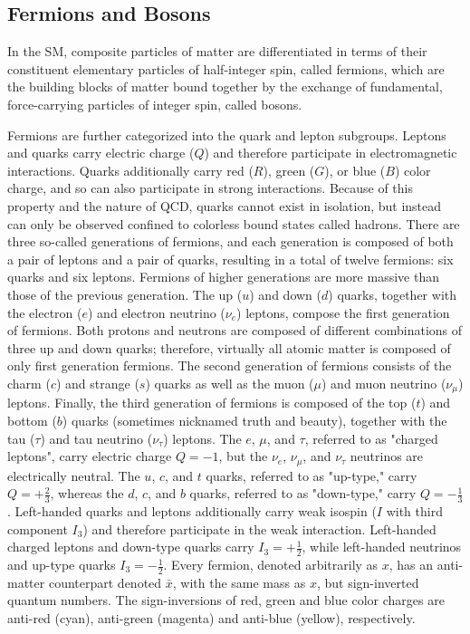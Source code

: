 \subsection{Fermions and Bosons}
In the SM, composite particles of matter are differentiated in terms of their constituent elementary particles of half-integer spin, called fermions, which are the building blocks of matter bound together by the exchange of fundamental, force-carrying particles of integer spin, called bosons. 

Fermions are further categorized into the quark and lepton subgroups.
Leptons and quarks carry electric charge ($Q$) and therefore participate in electromagnetic interactions.
Quarks additionally carry red ($R$), green ($G$), or blue ($B$) color charge, and so can also participate in strong interactions.
Because of this property and the nature of QCD, quarks cannot exist in isolation, but instead can only be observed confined to colorless bound states called hadrons.
There are three so-called generations of fermions, and each generation is composed of both a pair of leptons and a pair of quarks, resulting in a total of twelve fermions: six quarks and six leptons.
Fermions of higher generations are more massive than those of the previous generation.
The up ($u$) and down ($d$) quarks, together with the electron ($e$) and electron neutrino ($\nu_e$) leptons, compose the first generation of fermions.
Both protons and neutrons are composed of different combinations of three up and down quarks; therefore, virtually all atomic matter is composed of only first generation fermions.
The second generation of fermions consists of the charm ($c$) and strange ($s$) quarks as well as the muon ($\mu$) and muon neutrino ($\nu_\mu$) leptons.
Finally, the third generation of fermions is composed of the top ($t$) and bottom ($b$) quarks (sometimes nicknamed truth and beauty), together with the tau ($\tau$) and tau neutrino ($\nu_\tau$) leptons.
The $e$, $\mu$, and $\tau$, referred to as "charged leptons", carry electric charge $Q = -1$, but the $\nu_e$, $\nu_\mu$, and $\nu_\tau$ neutrinos are electrically neutral.
The $u$, $c$, and $t$ quarks, referred to as "up-type," carry $Q = +\frac{2}{3}$, whereas the $d$, $c$, and $b$ quarks, referred to as "down-type," carry $Q = -\frac{1}{3}$.
Left-handed quarks and leptons additionally carry weak isospin ($I$ with third component $I_3$) and therefore participate in the weak interaction.
Left-handed charged leptons and down-type quarks carry $I_3 = +\frac{1}{2}$, while left-handed neutrinos and up-type quarks $I_3 = -\frac{1}{2}$.
Every fermion, denoted arbitrarily as $x$, has an anti-matter counterpart denoted $\bar{x}$, with the same mass as $x$, but sign-inverted quantum numbers.
The sign-inversions of red, green and blue color charges are anti-red (cyan), anti-green (magenta) and anti-blue (yellow), respectively.

